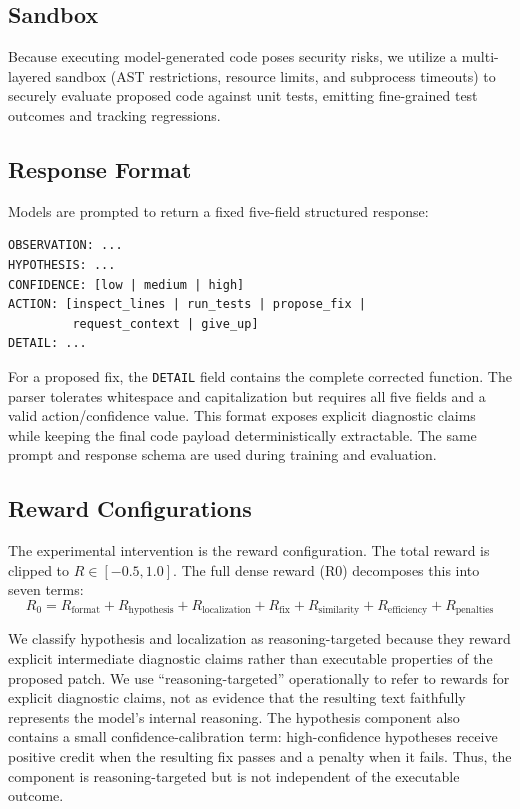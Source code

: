 \documentclass{article}
\begin{document}
\subsection{Sandbox}
Because executing model-generated code poses security risks, we utilize a multi-layered sandbox (AST restrictions, resource limits, and subprocess timeouts) to securely evaluate proposed code against unit tests, emitting fine-grained test outcomes and tracking regressions.

\subsection{Response Format}
Models are prompted to return a fixed five-field structured response:

\begin{verbatim}
OBSERVATION: ...
HYPOTHESIS: ...
CONFIDENCE: [low | medium | high]
ACTION: [inspect_lines | run_tests | propose_fix |
         request_context | give_up]
DETAIL: ...
\end{verbatim}

For a proposed fix, the \texttt{DETAIL} field contains the complete corrected
function. The parser tolerates whitespace and capitalization but requires all
five fields and a valid action/confidence value. This format exposes explicit
diagnostic claims while keeping the final code payload deterministically
extractable. The same prompt and response schema are used during training and
evaluation.

\subsection{Reward Configurations}
The experimental intervention is the reward configuration. The total reward is clipped to $R \in [-0.5, 1.0]$. The full dense reward (R0) decomposes this into seven terms:
\begin{equation}
R_0 = R_{\text{format}} + R_{\text{hypothesis}} + R_{\text{localization}} + R_{\text{fix}} + R_{\text{similarity}} + R_{\text{efficiency}} + R_{\text{penalties}}
\end{equation}

We classify hypothesis and localization as reasoning-targeted because they reward explicit intermediate diagnostic claims rather than executable properties of the proposed patch. We use ``reasoning-targeted'' operationally to refer to rewards for explicit diagnostic claims, not as evidence that the resulting text faithfully represents the model's internal reasoning. The hypothesis component also contains a small confidence-calibration term: high-confidence hypotheses receive positive credit when the resulting fix passes and a penalty when it fails. Thus, the component is reasoning-targeted but is not independent of the executable outcome.
\end{document}
